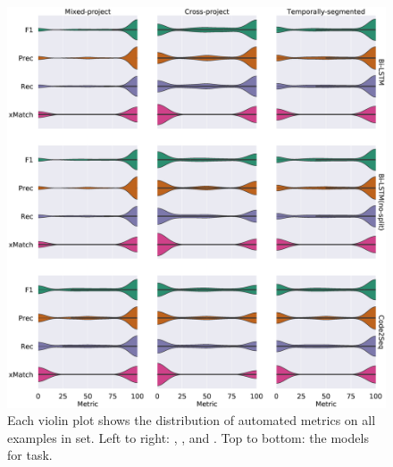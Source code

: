 \begin{figure}[t]
  \centering
  \includegraphics[width=\columnwidth]{figs/models-results-metrics-dist-MethNam.eps}
  \caption{Each violin plot shows the distribution of automated
    metrics on all examples in \test set.  Left to right: \mixedproj,
    \crossproj, and \evoaware \methodologies.  Top to bottom: the
    models for \methnam
    task. \label{fig:models-results-metrics-dist-MethNam}}
\end{figure}

